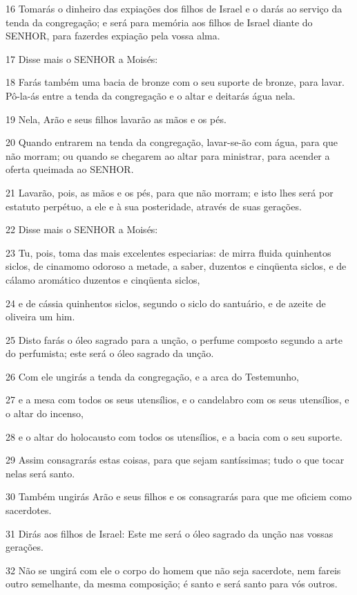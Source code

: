 \par 16 Tomarás o dinheiro das expiações dos filhos de Israel e o darás ao serviço da tenda da congregação; e será para memória aos filhos de Israel diante do SENHOR, para fazerdes expiação pela vossa alma.
\par 17 Disse mais o SENHOR a Moisés:
\par 18 Farás também uma bacia de bronze com o seu suporte de bronze, para lavar. Pô-la-ás entre a tenda da congregação e o altar e deitarás água nela.
\par 19 Nela, Arão e seus filhos lavarão as mãos e os pés.
\par 20 Quando entrarem na tenda da congregação, lavar-se-ão com água, para que não morram; ou quando se chegarem ao altar para ministrar, para acender a oferta queimada ao SENHOR.
\par 21 Lavarão, pois, as mãos e os pés, para que não morram; e isto lhes será por estatuto perpétuo, a ele e à sua posteridade, através de suas gerações.
\par 22 Disse mais o SENHOR a Moisés:
\par 23 Tu, pois, toma das mais excelentes especiarias: de mirra fluida quinhentos siclos, de cinamomo odoroso a metade, a saber, duzentos e cinqüenta siclos, e de cálamo aromático duzentos e cinqüenta siclos,
\par 24 e de cássia quinhentos siclos, segundo o siclo do santuário, e de azeite de oliveira um him.
\par 25 Disto farás o óleo sagrado para a unção, o perfume composto segundo a arte do perfumista; este será o óleo sagrado da unção.
\par 26 Com ele ungirás a tenda da congregação, e a arca do Testemunho,
\par 27 e a mesa com todos os seus utensílios, e o candelabro com os seus utensílios, e o altar do incenso,
\par 28 e o altar do holocausto com todos os utensílios, e a bacia com o seu suporte.
\par 29 Assim consagrarás estas coisas, para que sejam santíssimas; tudo o que tocar nelas será santo.
\par 30 Também ungirás Arão e seus filhos e os consagrarás para que me oficiem como sacerdotes.
\par 31 Dirás aos filhos de Israel: Este me será o óleo sagrado da unção nas vossas gerações.
\par 32 Não se ungirá com ele o corpo do homem que não seja sacerdote, nem fareis outro semelhante, da mesma composição; é santo e será santo para vós outros.
